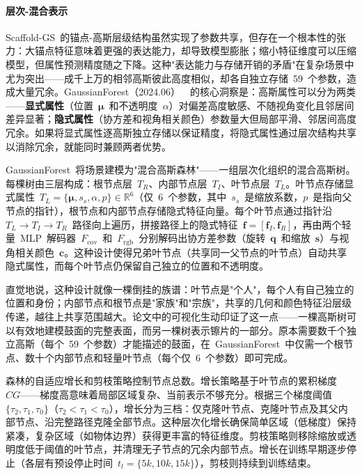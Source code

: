 \paragraph{层次-混合表示}

Scaffold-GS~的锚点-高斯层级结构虽然实现了参数共享，但存在一个根本性的张力：大锚点特征意味着更强的表达能力，却导致模型膨胀；缩小特征维度可以压缩模型，但属性预测精度随之下降。这种"表达能力与存储开销的矛盾"在复杂场景中尤为突出——成千上万的相邻高斯彼此高度相似，却各自独立存储~59~个参数，造成大量冗余。GaussianForest（2024.06）~\cite{2406_08759}~的核心洞察是：高斯属性可以分为两类——\textbf{显式属性}（位置~$\bm{\mu}$~和不透明度~$\alpha$）对偏差高度敏感、不随视角变化且邻居间差异显著；\textbf{隐式属性}（协方差和视角相关颜色）参数量大但局部平滑、邻居间高度冗余。如果将显式属性逐高斯独立存储以保证精度，将隐式属性通过层次结构共享以消除冗余，就能同时兼顾两者优势。

GaussianForest~将场景建模为"混合高斯森林"——一组层次化组织的混合高斯树。每棵树由三层构成：根节点层~$T_R$、内部节点层~$T_I$、叶节点层~$T_L$。叶节点存储显式属性~$T_L = \{\bm{\mu}, s_s, \alpha, p\} \in \mathbb{R}^6$（仅~6~个参数，其中~$s_s$~是缩放系数，$p$~是指向父节点的指针），根节点和内部节点存储隐式特征向量。每个叶节点通过指针沿~$T_L \to T_I \to T_R$~路径向上遍历，拼接路径上的隐式特征~$\bm{f} = [\bm{f}_I, \bm{f}_R]$，再由两个轻量~MLP~解码器~$F_{\text{cov}}$~和~$F_{\text{rgb}}$~分别解码出协方差参数（旋转~$\bm{q}$~和缩放~$\bm{s}$）与视角相关颜色~$\bm{c}$。这种设计使得兄弟叶节点（共享同一父节点的叶节点）自动共享隐式属性，而每个叶节点仍保留自己独立的位置和不透明度。

直觉地说，这种设计就像一棵倒挂的族谱：叶节点是"个人"，每个人有自己独立的位置和身份；内部节点和根节点是"家族"和"宗族"，共享的几何和颜色特征沿层级传递，越往上共享范围越大。论文中的可视化生动印证了这一点——一棵高斯树可以有效地建模鼓面的完整表面，而另一棵树表示镲片的一部分。原本需要数千个独立高斯（每个~59~个参数）才能描述的鼓面，在~GaussianForest~中仅需一个根节点、数十个内部节点和轻量叶节点（每个仅~6~个参数）即可完成。

森林的自适应增长和剪枝策略控制节点总数。增长策略基于叶节点的累积梯度~$CG$——梯度高意味着局部区域复杂、当前表示不够充分。根据三个梯度阈值~$\{\tau_2, \tau_1, \tau_0\}$（$\tau_2 < \tau_1 < \tau_0$），增长分为三档：仅克隆叶节点、克隆叶节点及其父内部节点、沿完整路径克隆全部节点。这种层次化增长确保简单区域（低梯度）保持紧凑，复杂区域（如物体边界）获得更丰富的特征维度。剪枝策略则移除缩放或透明度低于阈值的叶节点，并清理无子节点的冗余内部节点。增长在训练早期逐步停止（各层有预设停止时间~$t_l = \{5k, 10k, 15k\}$），剪枝则持续到训练结束。

